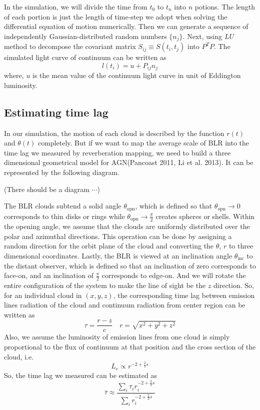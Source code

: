 \documentclass{article}
\begin{document}
In the simulation, we will divide the time from $t_0$ to $t_n$ into $n$ potions. The length of each portion is just the length of time-step we adopt when solving the differential equation of motion numerically. Then we can generate a sequence of independently Gaussian-distributed random numbers $\{n_j\}$. Next, using $LU$ method to decompose the covariant matrix $S_{ij} \equiv S(t_i,t_j)$ into $P^TP$. The simulated light curve of continuum can be written as
\[l(t_i) = u + P_{ij}n_j\]
where, $u$ is the mean value of the continuum light curve in unit of Eddington luminosity. 

\subsection{Estimating time lag}
In our simulation, the motion of each cloud is described by the function $r(t)$ and $\theta(t)$ completely. But if we want to map the average scale of BLR into the time lag we measured by reverberation mapping, we need to build a three dimensional geometrical model for AGN(Pancoast 2011, Li et al. 2013). It can be represented by the following diagram.

(There should be a diagram $\cdots$)

The BLR clouds subtend a solid angle $\theta_{\mathrm{opn}}$, which is defined so that $\theta_{\mathrm{opn}} \to 0$ corresponds to thin disks or rings while $\theta_{\mathrm{opn}} \to \frac{\pi}{2}$ creates spheres or shells. Within the opening angle, we assume that the clouds are uniformly distributed over the polar and azimuthal
directions. This operation can be done by assigning a random direction for the orbit plane of the cloud and converting the $\theta$, $r$ to three dimensional coordinates. Lastly, the BLR is viewed at an inclination angle $\theta_{\mathrm{inc}}$ to the distant observer, which is defined so that an inclination of zero corresponds to face-on, and an inclination of $\frac{\pi}{2}$ corresponds to edge-on. And we will rotate the entire configuration of the system to make the line of sight be the $z$ direction. 
So, for an individual cloud in $(x,y,z)$, the corresponding time lag between emission lines radiation of the cloud and continuum radiation from center region can be written as
\[\tau = \frac{r - z}{c} \quad r = \sqrt{x^2+y^2+z^2}\]
Also, we assume the luminosity of emission lines from one cloud is simply proportional to the flux of continuum at that position and the cross section of the cloud, i.e. 
\[L_{e} \propto r^{-2+\frac{2}{3}s}\]
So, the time lag we measured can be estimated as
\[\bar{\tau} \approx \frac{\sum_i \tau_i r_i^{-2+\frac{2}{3}s}}{\sum_i r_i^{-2+\frac{2}{3}s}} \]
\end{document}
